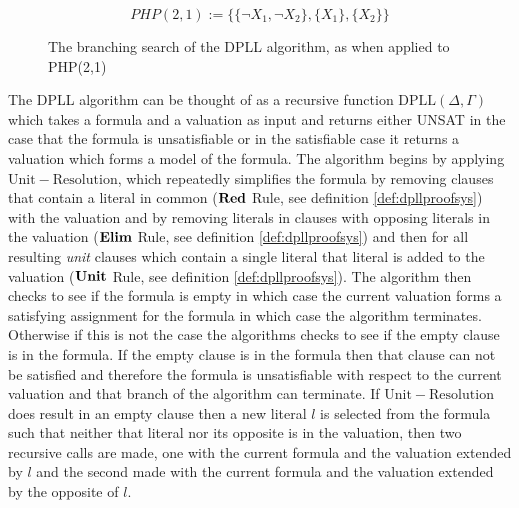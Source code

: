 $$PHP(2,1) := \{\{\neg X_1, \neg X_2\}, \{ X_1 \}, \{ X_2 \} \}$$


\bigskip
\begin{figure}[h!]
\begin{center}
\end{center}
\caption{The branching search of the DPLL algorithm, as when applied to PHP(2,1)}
\end{figure}
\bigskip

The DPLL algorithm can be thought of as a recursive function $\mathrm{DPLL}(\Delta,\Gamma)$ which takes a formula and a valuation as input and returns either UNSAT in the case that the formula is unsatisfiable or in the satisfiable case it returns a valuation which forms a model of the formula.  The algorithm begins by applying $\mathrm{Unit-Resolution}$, which repeatedly simplifies the formula by removing clauses that contain a literal in common ($\mathbf{Red}$ Rule, see definition \ref{def:dpllproofsys}) with the valuation and by removing literals in clauses with opposing literals in the valuation ($\mathbf{Elim}$ Rule, see definition \ref{def:dpllproofsys}) and then for all resulting \emph{unit} clauses which contain a single literal that literal is added to the valuation ($\mathbf{Unit}$ Rule, see definition \ref{def:dpllproofsys}).  The algorithm then checks to see if the formula is empty in which case the current valuation forms a satisfying assignment for the formula in which case the algorithm terminates.  Otherwise if this is not the case the algorithms checks to see if the empty clause is in the formula. If the empty clause is in the formula then that clause can not be satisfied and therefore the formula is unsatisfiable with respect to the current valuation and that branch of the algorithm can terminate. If $\mathrm{Unit-Resolution}$ does result in an empty clause then a new literal $l$ is selected from the formula such that neither that literal nor its opposite is in the valuation, then two recursive calls are made, one with the current formula and the valuation extended by $l$ and the second made with the current formula and the valuation extended by the opposite of $l$. 

